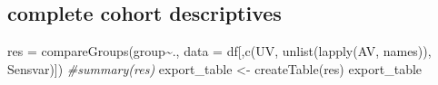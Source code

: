 \documentclass[
]{article}
\newenvironment{Shaded}{\begin{snugshade}}{\end{snugshade}}
\newcommand{\AttributeTok}[1]{\textcolor[rgb]{0.77,0.63,0.00}{#1}}
\newcommand{\CommentTok}[1]{\textcolor[rgb]{0.56,0.35,0.01}{\textit{#1}}}
\newcommand{\FunctionTok}[1]{\textcolor[rgb]{0.00,0.00,0.00}{#1}}
\newcommand{\NormalTok}[1]{#1}
\newcommand{\OtherTok}[1]{\textcolor[rgb]{0.56,0.35,0.01}{#1}}
\newcommand{\SpecialCharTok}[1]{\textcolor[rgb]{0.00,0.00,0.00}{#1}}
\begin{document}
\hypertarget{complete-cohort-descriptives}{%
\subsection{complete cohort
descriptives}\label{complete-cohort-descriptives}}

\begin{Shaded}
\begin{Highlighting}[]
\NormalTok{res }\OtherTok{=} \FunctionTok{compareGroups}\NormalTok{(group}\SpecialCharTok{\textasciitilde{}}\NormalTok{., }\AttributeTok{data =}\NormalTok{ df[,}\FunctionTok{c}\NormalTok{(UV, }\FunctionTok{unlist}\NormalTok{(}\FunctionTok{lapply}\NormalTok{(AV, names)), Sensvar)])}
\CommentTok{\#summary(res)}
\NormalTok{export\_table }\OtherTok{\textless{}{-}} \FunctionTok{createTable}\NormalTok{(res)}
\NormalTok{export\_table}
\end{Highlighting}
\end{Shaded}
\end{document}
